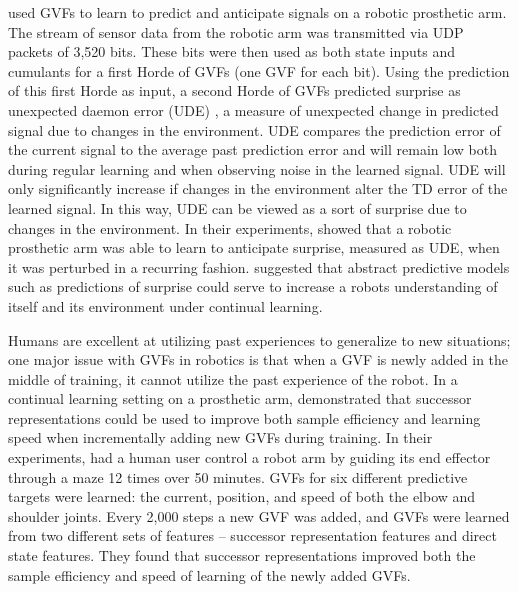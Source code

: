 \documentclass{article} %
\theoremstyle{plain}
\theoremstyle{definition}
\theoremstyle{remark}
\begin{document}
\cite{gunther2018predictions} used GVFs to learn to predict and anticipate signals on a robotic prosthetic arm.
The stream of sensor data from the robotic arm was transmitted via UDP packets of 3,520 bits. These bits were then used
as both state inputs and cumulants for a first Horde of GVFs (one GVF for each bit). Using the prediction of this first
Horde as input, a second Horde of GVFs predicted surprise as unexpected daemon error (UDE)
\citep{white2015developing}, a measure of unexpected change in predicted signal due to changes in the environment. UDE
compares the prediction error of the current signal to the average past prediction error and
will remain low both during regular learning and when observing noise in the learned signal. UDE will only significantly
increase if changes in the environment alter the TD error of the learned signal. In this way, UDE can be viewed as a
sort of surprise due to changes in the environment. In their experiments, \cite{gunther2018predictions} showed that a
robotic prosthetic arm was able to learn to anticipate surprise,
measured as UDE, when it was perturbed in a recurring fashion. \cite{gunther2018predictions} suggested that abstract
predictive models such as predictions of surprise could serve to increase a robots understanding of itself and its
environment under continual learning.

Humans are excellent at utilizing past experiences to generalize to new situations; one major issue with GVFs in
robotics is that when a GVF is newly added in the middle of training, it cannot utilize the past experience of the
robot. In a continual learning setting on a prosthetic arm, \cite{sherstan2018accelerating} demonstrated that successor
representations \citep{dayan1993improving} could be used to improve both sample efficiency and learning speed when
incrementally adding new GVFs during training. In their experiments, \cite{sherstan2018accelerating} had a human user
control a robot arm by guiding its end effector through a maze 12 times over 50 minutes. GVFs for six different
predictive targets were learned: the current, position, and speed of both the elbow and shoulder joints. Every 2,000
steps a new GVF was added, and GVFs were learned from two different sets of features -- successor representation
features and direct state features. They found that successor representations improved both the sample efficiency and
speed of learning of the newly added GVFs.
\end{document}
